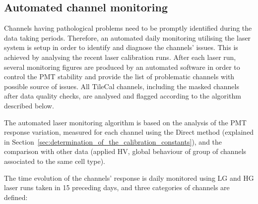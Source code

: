 
\subsection{Automated channel monitoring}

Channels having pathological problems need to be promptly identified during the data taking periods. Therefore, an automated daily monitoring utilising the laser system is setup in order to identify and diagnose the channels' issues. This is achieved by analysing the recent laser calibration runs. After each laser run, several monitoring figures are produced by an automated software in order to control the PMT stability and provide the list of problematic channels with possible source of issues. All TileCal channels, including the masked channels after data quality checks, are analysed and flagged according to the algorithm described below.

The automated laser monitoring algorithm is based on the analysis of the PMT response variation, measured for each channel using the Direct method (explained in Section~\ref{sec:determination_of_the_calibration_constants}), and the comparison with other data (applied HV, global behaviour of group of channels associated to the same cell type). 

The time evolution of the channels' response is daily monitored using LG and HG laser runs taken in 15 preceding days, and three categories of channels are defined:

